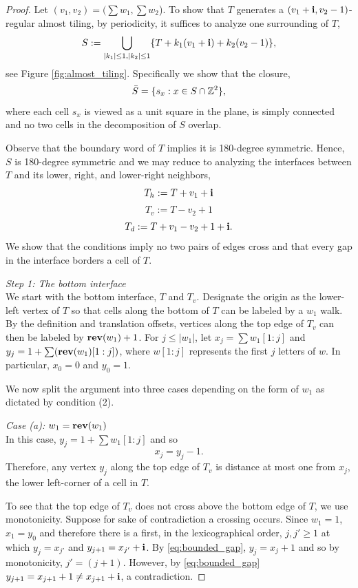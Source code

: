 \documentclass[12pt]{amsart}
\begin{document}
\begin{proof}
	Let $(v_1,v_2) = (\sum w_1, \sum w_2$). To show that $T$ generates a $(v_1 + \mathbf{i}, v_2 -1)$-regular almost tiling, by periodicity, 
	it suffices to analyze one surrounding of $T$, 
	\[
	S :=  \bigcup_{|k_1| \leq 1, |k_2| \leq 1} \{ T + k_1 (v_1+ \mathbf{i}) + k_2 (v_2-1)\},
	\]
	see Figure \ref{fig:almost_tiling}. 
	Specifically we show that the closure, 
	\[
	\bar{S} = \{ s_x : x \in S \cap \mathbb{Z}^2\},
	\]
	where each cell $s_x$ is viewed as a unit square in the plane, is simply connected and no two cells in the decomposition of $S$ overlap. 
	
	Observe that the boundary word of $T$ implies it is 180-degree symmetric. Hence, $S$ is 180-degree symmetric and we may reduce to analyzing the interfaces between $T$ and its lower, right, and lower-right neighbors,  
	\[
	T_h := T + v_1 + \mathbf{i}
	\]
	\[
	T_v := T - v_2 + 1
	\]
	\[
	T_d := T + v_1 - v_2 + 1 + \mathbf{i}.
	\]
	We show that the conditions imply no two pairs of edges cross and that every gap in the interface borders a cell of $T$.	
	
	
	
	
	{\it Step 1: The bottom interface} \\
	We start with the bottom interface, $T$ and $T_{v}$. 
	Designate the origin as the lower-left vertex of $T$ so that cells along the bottom of
	$T$ can be labeled by a $w_1$ walk. By the definition and translation offsets, 
	vertices along the top edge of $T_{v}$ can then be labeled by $\mathop{\bf rev}(w_1)+1$.
	For $j \leq |w_1|$, let $x_j = \sum w_1[1:j]$ and $y_j = 1 + \sum (\mathop{\bf rev}(w_1)[1:j])$, 
	where $w[1:j]$ represents the first $j$ letters of $w$. In particular, $x_0 =0$ and $y_0 = 1$. 
	
	We now split the argument into three cases depending on the form of $w_1$ as dictated by condition (2). 
	
	{\it Case (a):  $w_1 = \mathop{\bf rev}(w_1)$} \\
	In this case, $y_j = 1 + \sum w_1[1:j]$ and so
	\begin{equation} \label{eq:bounded_gap}
	x_j = y_j - 1.
	\end{equation}
	Therefore, any vertex $y_j$ along the top edge of $T_{v}$ is distance at most one from $x_j$, the lower left-corner of a cell in $T$. 
	
	To see that the top edge of $T_v$ does not cross above the bottom edge of $T$, we use monotonicity.
	Suppose for sake of contradiction a crossing occurs. Since $w_1 = 1$, $x_1 = y_0$ and therefore there is a first, in the lexicographical order, $j,j' \geq 1$ at which
	$y_j = x_{j'}$ and $y_{j+1} = x_{j'} + \mathbf{i}$. By \eqref{eq:bounded_gap}, $y_j = x_{j} + 1$ and so by monotonicity, $j' = (j+1)$.
	However, by  \eqref{eq:bounded_gap} $y_{j+1} = x_{j+1} + 1 \neq x_{j+1} +  \mathbf{i}$, a contradiction. 
	

\end{proof}
\end{document}
